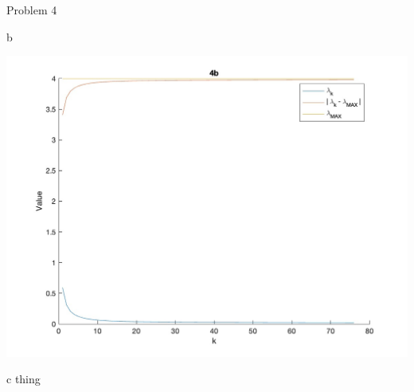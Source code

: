 \begin{section}{Problem 4}
\begin{solution}{b}
        \begin{mdframed}
            \includegraphics[scale=0.33]{DevamSisodraker_4b.jpg}
        \end{mdframed}
    \end{solution}

    \newpage
    
    \begin{solution}{c}
        thing
    \end{solution}
\end{section}